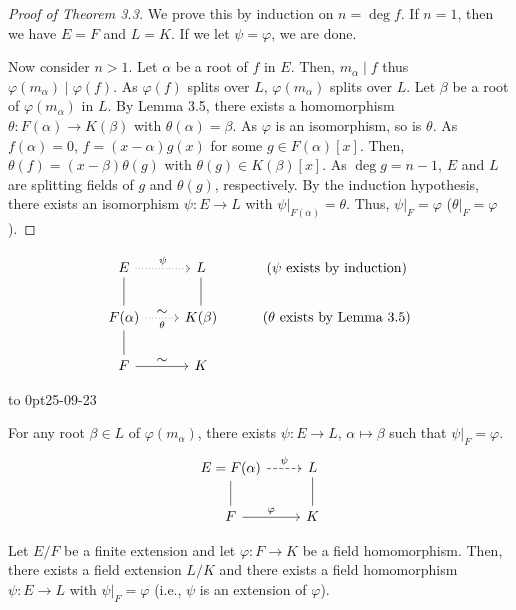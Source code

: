 \documentclass[twoside]{article}
\theoremstyle{remark}
\newcommand*\newclass[1]{\par\vbox to 0pt{\hbox{\tiny\sffamily\color{gray}#1}} \par\ignorespaces}
\begin{document}
\begin{proof}[Proof of Theorem 3.3]
  We prove this by induction on \(n = \deg f\). If \(n=1\), then we have \(E=F\) and \(L=K\). If we let \(\psi=\varphi\), we are done.
  
  Now consider \(n>1\). Let \(\alpha\) be a root of \(f\) in \(E\). Then, \(m_\alpha \mid f\) thus \(\varphi(m_\alpha) \mid \varphi(f)\). As \(\varphi(f)\) splits over \(L\), \(\varphi(m_\alpha)\) splits over \(L\). Let \(\beta\) be a root of \(\varphi(m_\alpha)\) in \(L\). By Lemma 3.5, there exists a homomorphism \(\theta\colon F(\alpha) \to K(\beta)\) with \(\theta(\alpha) = \beta\). As \(\varphi\) is an isomorphism, so is \(\theta\). As \(f(\alpha) = 0\), \(f = (x-\alpha) g(x)\) for some \(g \in F(\alpha)[x]\). Then, \(\theta(f) = (x-\beta) \theta(g)\) with \(\theta(g) \in K(\beta)[x]\). As \(\deg g = n-1\), \(E\) and \(L\) are splitting fields of \(g\) and \(\theta(g)\), respectively. By the induction hypothesis, there exists an isomorphism \(\psi\colon E \to L\) with \(\psi|_{F(\alpha)} = \theta\). Thus, \(\psi|_F = \varphi\) (\(\theta|_F = \varphi\)).
\end{proof}

\begin{displaymath}
  \begin{tikzcd}
    E \rar[dotted,"\psi"]\dar[dash] & L\dar[dash] & \text{(\(\psi\) exists by induction)} \\
    F(\alpha)\rar[dotted,"\textstyle\sim","\theta"swap]\dar[dash] & K(\beta) & \text{(\(\theta\) exists by Lemma 3.5)} \\
    F\rar["\textstyle\sim"] & K
  \end{tikzcd}
\end{displaymath}

\newclass{25-09-23}

\begin{lemma}
  For any root \(\beta \in L\) of \(\varphi(m_\alpha)\), there exists \(\psi\colon E \to L\), \(\alpha \mapsto \beta\) such that \(\psi|_F = \varphi\).
  \begin{displaymath}
    \begin{tikzcd}
      E=F(\alpha)\dar[dash]\rar[dashed,"\psi"] & L\dar[dash] \\
      F\rar["\varphi"] & K
    \end{tikzcd}
  \end{displaymath}
\end{lemma}

\begin{lemma}
  Let \(E/F\) be a finite extension and let \(\varphi\colon F \to K\) be a field homomorphism. Then, there exists a field extension \(L/K\) and there exists a field homomorphism \(\psi\colon E \to L\) with \(\psi|_F = \varphi\) (i.e., \(\psi\) is an extension of \(\varphi\)).
\end{lemma}
\end{document}
